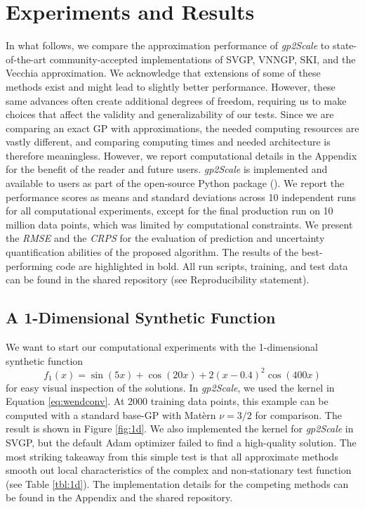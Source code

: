 \documentclass{article}
\begin{document}
\section{Experiments and Results}
In what follows, we compare the approximation performance of \emph{gp2Scale} to state-of-the-art community-accepted implementations of SVGP, VNNGP, SKI, and the Vecchia approximation. We acknowledge that extensions of some of these methods exist and might lead to slightly better performance. However, these same advances often create additional degrees of freedom, requiring us to make choices that affect the validity and generalizability of our tests. Since we are comparing an exact GP with approximations, the needed computing resources are vastly different, and comparing computing times and needed architecture is therefore meaningless. However, we report computational details in the Appendix for the benefit of the reader and future users. \emph{gp2Scale} is implemented and available to users as part of the open-source  Python package (). We report the performance scores as means and standard deviations across 10 independent runs for all computational experiments, except for the final production run on 10 million data points, which was limited by computational constraints. We present the \emph{RMSE} and the \emph{CRPS} for the evaluation of prediction and uncertainty quantification abilities of the proposed algorithm. 
The results of the best-performing code are highlighted in bold. All run scripts, training, and test data can be found in the shared repository (see Reproducibility statement).

\subsection{A 1-Dimensional Synthetic Function}
We want to start our computational experiments with the 1-dimensional synthetic function 
\[
f_1(x) = \sin(5x) + \cos(20x) + 2(x - 0.4)^2 \cos(400x)
\]
for easy visual inspection of the solutions. In \emph{gp2Scale}, we used the kernel in Equation \ref{eq:wendconv}. At 2000 training data points, this example can be computed with a standard base-GP with Mat\`ern $\nu=3/2$ for comparison.
The result is shown in Figure \ref{fig:1d}. 
We also implemented the kernel for \emph{gp2Scale} in SVGP, but the default Adam optimizer failed to find a high-quality solution. 
The most striking takeaway from this simple test is that all approximate methods smooth out local characteristics of the complex and non-stationary test function (see Table \ref{tbl:1d}). The implementation details for the competing methods can be found in the Appendix and the shared repository.
 
\end{document}
